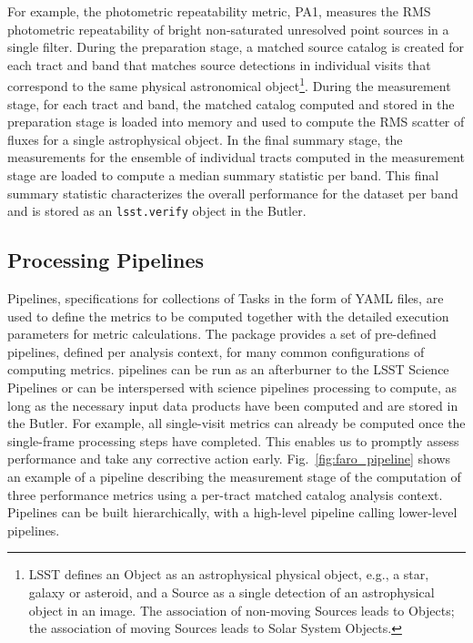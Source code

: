 For example, the photometric repeatability metric, PA1, measures the RMS photometric repeatability of bright non-saturated unresolved point sources in a single filter.
During the preparation stage, a matched source catalog is created for each tract and band that matches source detections in individual visits that correspond to the same physical astronomical object\footnote{LSST defines an Object as an astrophysical physical object, e.g., a star, galaxy or asteroid, and a Source as a single detection of an astrophysical object in an image. The association of non-moving Sources leads to Objects; the association of moving Sources leads to Solar System Objects.}.
During the measurement stage, for each tract and band, the matched catalog computed and stored in the preparation stage is loaded into memory and used to compute the RMS scatter of fluxes for a single astrophysical object. 
In the final summary stage, the measurements for the ensemble of individual tracts computed in the measurement stage are loaded to compute a median summary statistic per band. 
This final summary statistic characterizes the overall performance for the dataset per band and is stored as an \texttt{lsst.verify} object in the Butler. 

\subsection{Processing Pipelines} \label{ssec:pipelines}

Pipelines, specifications for collections of Tasks in the form of YAML files, are used to define the \faro metrics to be computed together with the detailed execution parameters for metric calculations.
The \faro package provides a set of pre-defined pipelines, defined per analysis context, for many common configurations of computing metrics. 
\faro pipelines can be run as an afterburner to the LSST Science Pipelines or can be interspersed with science pipelines processing to compute, as long as the necessary input data products have been computed and are stored in the Butler.
For example, all single-visit metrics can already be computed once the single-frame processing steps have completed. 
This enables us to promptly assess performance and take any corrective action early. 
Fig.~\ref{fig:faro_pipeline} shows an example of a \faro pipeline describing the measurement stage of the computation of three performance metrics using a per-tract matched catalog analysis context.
Pipelines can be built hierarchically, with a high-level pipeline calling lower-level pipelines.

